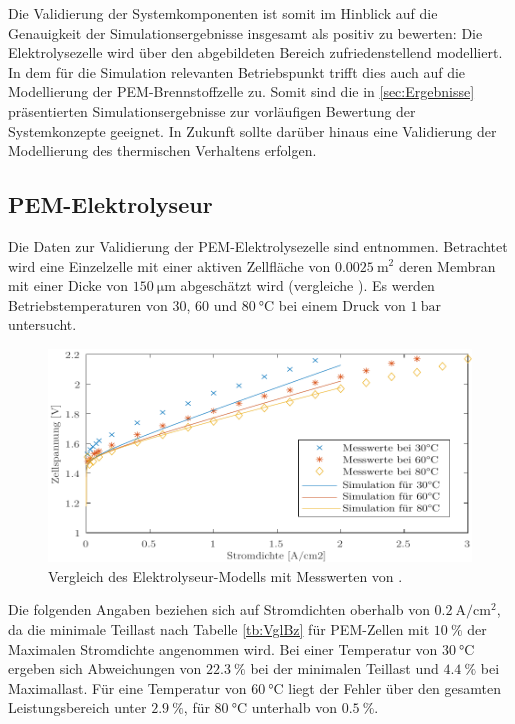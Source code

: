 Die Validierung der Systemkomponenten ist somit im Hinblick auf die Genauigkeit der Simulationsergebnisse insgesamt als positiv zu bewerten: Die Elektrolysezelle wird über den abgebildeten Bereich zufriedenstellend modelliert. In dem für die Simulation relevanten Betriebspunkt trifft dies auch auf die Modellierung der PEM-Brennstoffzelle zu. Somit sind die in \ref{sec:Ergebnisse} präsentierten Simulationsergebnisse zur vorläufigen Bewertung der Systemkonzepte geeignet.
In Zukunft sollte darüber hinaus eine Validierung der Modellierung des thermischen Verhaltens erfolgen.

\subsection{PEM-Elektrolyseur}
Die Daten zur Validierung der PEM-Elektrolysezelle sind \citet[S. 36]{tjarks_pem-elektrolyse-systeme_2017} entnommen. Betrachtet wird eine Einzelzelle mit einer aktiven Zellfläche von $\SI{0,0025}{\m\squared}$ deren Membran mit einer Dicke von $\SI{150}{\micro\m}$ abgeschätzt wird (vergleiche \citet{rashid_hydrogen_2015}).
Es werden Betriebstemperaturen von $30$, $60$ und $\SI{80}{\degreeCelsius}$ bei einem Druck von $\SI{1}{\bar}$ untersucht.\\

\begin{figure}[h]
	\centering
		\includegraphics[scale=1]{Figures/ValidierungPEMEC}
		\caption{Vergleich des Elektrolyseur-Modells mit Messwerten von \citet{tjarks_pem-elektrolyse-systeme_2017}.}
\label{fig:ValPEMEC}	
\end{figure}

Die folgenden Angaben beziehen sich auf Stromdichten oberhalb von $\SI{0,2}{\A\per\cm\squared}$, da die minimale Teillast nach Tabelle \ref{tb:VglBz} für PEM-Zellen mit $\SI{10}{\%}$ der Maximalen Stromdichte angenommen wird. Bei einer Temperatur von $\SI{30}{\degreeCelsius}$ ergeben sich Abweichungen von  $\SI{22,3}{\%}$ bei der minimalen Teillast und $\SI{4,4}{\%}$ bei Maximallast. 
Für eine Temperatur von  $\SI{60}{\degreeCelsius}$ liegt der Fehler über den gesamten Leistungsbereich unter $\SI{2,9}{\%}$, für $\SI{80}{\degreeCelsius}$ unterhalb von $\SI{0,5}{\%}$.\\

